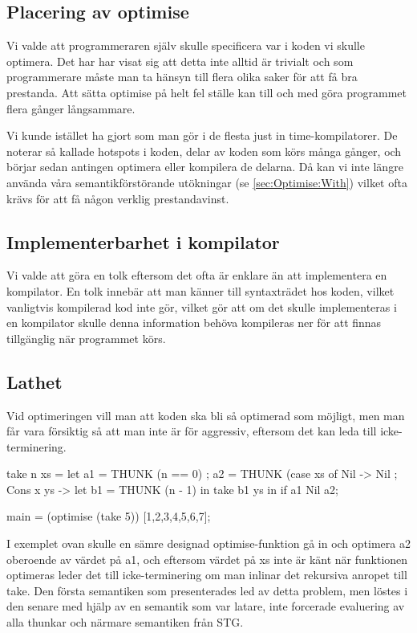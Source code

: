 \documentclass[Rapport]{subfiles}
\begin{document}
\subsection{Placering av optimise}

Vi valde att programmeraren själv skulle  specificera var i koden vi skulle optimera. Det har har visat sig att detta inte alltid är trivialt och som programmerare måste man ta hänsyn till flera olika saker för att få bra prestanda. Att sätta optimise på helt fel ställe kan till och med göra programmet flera gånger långsammare.

Vi kunde istället ha gjort som man gör i de flesta just in time-kompilatorer. De noterar så kallade hotspots i koden, delar av koden som körs många gånger, och börjar sedan antingen optimera eller kompilera de delarna. Då kan vi inte längre använda våra semantikförstörande utökningar (se \ref{sec:Optimise:With}) vilket ofta krävs för att få någon verklig prestandavinst. 






\subsection{Implementerbarhet i kompilator}
Vi valde att göra en tolk eftersom det ofta är enklare än att implementera en kompilator.
En tolk innebär att man känner till syntaxträdet hos koden, vilket vanligtvis kompilerad
kod inte gör, vilket gör att om det skulle implementeras i en kompilator skulle
denna information behöva kompileras ner för att finnas tillgänglig när programmet körs.


\subsection{Lathet}
Vid optimeringen vill man att koden ska bli så optimerad som möjligt, men man får
vara försiktig så att man inte är för aggressiv, 
eftersom det kan leda till icke-terminering.

\begin{codeEx}
take n xs = let
    { a1 = THUNK (n == 0)
    ; a2 = THUNK (case xs of
        { Nil -> Nil
        ; Cons x ys -> let
            { b1 = THUNK (n - 1)
            } in take b1 ys
        }
    } in if a1 Nil a2;

main = (optimise (take 5)) [1,2,3,4,5,6,7];
\end{codeEx}

I exemplet ovan skulle en sämre designad optimise-funktion gå in och optimera a2 oberoende av värdet på
a1, och eftersom värdet på xs inte är känt när funktionen optimeras leder det till
icke-terminering om man inlinar det rekursiva anropet till take.
    Den första semantiken som presenterades led av detta problem, men löstes i den senare med hjälp av
en semantik som var latare, inte forcerade evaluering av alla thunkar och närmare semantiken från STG.
\end{document}
